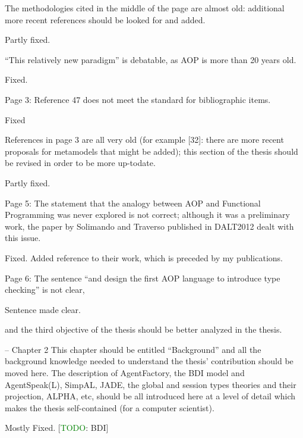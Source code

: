 \documentclass{article}
\newcommand{\todo}[1]{[\textcolor{green}{TODO}: #1]}
\newenvironment{them}{\noindent\begingroup\color{blue}}{\endgroup\par}
\begin{document}
\begin{them}

The methodologies cited in the middle of the page are almost old: additional
more recent references should be looked for and added.

\end{them}
Partly fixed.

\begin{them}

“This relatively new paradigm” is debatable, as AOP is more than 20 years old.
\end{them}
Fixed.

\begin{them}

Page 3:
Reference 47 does not meet the standard for bibliographic items.

\end{them}
Fixed

\begin{them}

References in page 3 are all very old (for example [32]: there are more recent
proposals for metamodels that might be added); this section of the thesis
should be revised in order to be more up-todate.

\end{them}
Partly fixed.

\begin{them}

Page 5:
The statement that the analogy between AOP and Functional Programming was never
explored is not correct; although it was a preliminary work, the paper by
Solimando and Traverso published in DALT2012 dealt with this issue.

\end{them}
Fixed. Added reference to their work, which is preceded by my publications.

\begin{them}

Page 6:
The sentence “and design the first AOP language to introduce type checking” is
not clear,

\end{them}
Sentence made clear. 

\begin{them}

and the third objective of the thesis should be better analyzed in
the thesis.

\end{them}
\todo{} 

\begin{them}

-- Chapter 2
This chapter should be entitled “Background” and all the background knowledge
needed to understand the thesis' contribution should be moved here. The
description of AgentFactory, the BDI model and AgentSpeak(L), SimpAL, JADE, the
global and session types theories and their projection, ALPHA, etc, should be
all introduced here at a level of detail which makes the thesis self-contained
(for a computer scientist).

\end{them}
Mostly Fixed.
\todo{BDI}
\end{document}
